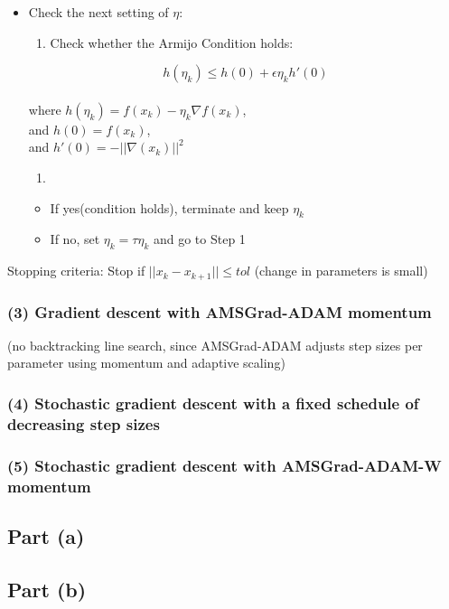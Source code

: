 \documentclass[
  letterpaper,
  DIV=11,
  numbers=noendperiod]{scrartcl}
\providecommand{\tightlist}{%
  \setlength{\itemsep}{0pt}\setlength{\parskip}{0pt}}\usepackage{longtable,booktabs,array}
\begin{document}
\begin{itemize}
\tightlist
\item
  Check the next setting of \(\eta\):

  \begin{enumerate}
  \def\labelenumi{\arabic{enumi}.}
  \tightlist
  \item
    Check whether the Armijo Condition holds:
  \end{enumerate}

  \[
  h(η_k) ≤ h(0) + ϵη_kh'(0)
  \]\\
  where \(h(η_k) = f(x_k) − η_k ∇f(x_k)\),\\
  and \(h(0) = f(x_k)\),\\
  and \(h'(0) = -||\nabla (x_k)||^2\)

  \begin{enumerate}
  \def\labelenumi{\arabic{enumi}.}
  \setcounter{enumi}{1}
  \tightlist
  \item
  \end{enumerate}

  \begin{itemize}
  \tightlist
  \item
    If yes(condition holds), terminate and keep \(η_k\)
  \item
    If no, set \(η_k = τη_k\) and go to Step 1
  \end{itemize}
\end{itemize}

Stopping criteria: Stop if \(||x_k - x_{k+1}|| ≤ tol\) (change in
parameters is small)

\subsubsection{(3) Gradient descent with AMSGrad-ADAM
momentum}\label{gradient-descent-with-amsgrad-adam-momentum}

(no backtracking line search, since AMSGrad-ADAM adjusts step sizes per
parameter using momentum and adaptive scaling)

\subsubsection{(4) Stochastic gradient descent with a fixed schedule of
decreasing step
sizes}\label{stochastic-gradient-descent-with-a-fixed-schedule-of-decreasing-step-sizes}

\subsubsection{(5) Stochastic gradient descent with AMSGrad-ADAM-W
momentum}\label{stochastic-gradient-descent-with-amsgrad-adam-w-momentum}

\subsection{Part (a)}\label{part-a}

\subsection{Part (b)}\label{part-b}
\end{document}

